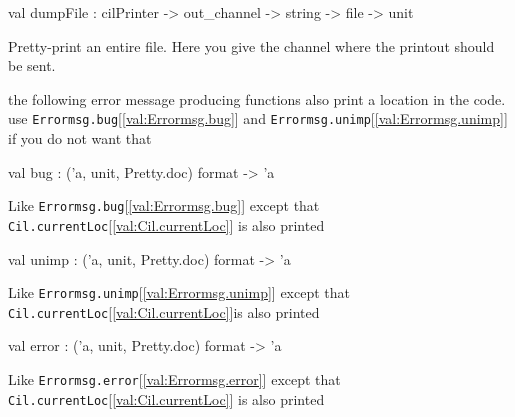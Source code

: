\documentclass[11pt]{article}
\begin{document}
\label{val:Cil.dumpFile}\begin{ocamldoccode}
val dumpFile : cilPrinter -> out_channel -> string -> file -> unit
\end{ocamldoccode}
\begin{ocamldocdescription}
Pretty-print an entire file. Here you give the channel where the printout
 should be sent.


\end{ocamldocdescription}




the following error message producing functions also print a location in 
 the code. use {\tt{Errormsg.bug}}[\ref{val:Errormsg.bug}] and {\tt{Errormsg.unimp}}[\ref{val:Errormsg.unimp}] if you do not want 
 that



\label{val:Cil.bug}\begin{ocamldoccode}
val bug : ('a, unit, Pretty.doc) format -> 'a
\end{ocamldoccode}
\begin{ocamldocdescription}
Like {\tt{Errormsg.bug}}[\ref{val:Errormsg.bug}] except that {\tt{Cil.currentLoc}}[\ref{val:Cil.currentLoc}] is also printed


\end{ocamldocdescription}




\label{val:Cil.unimp}\begin{ocamldoccode}
val unimp : ('a, unit, Pretty.doc) format -> 'a
\end{ocamldoccode}
\begin{ocamldocdescription}
Like {\tt{Errormsg.unimp}}[\ref{val:Errormsg.unimp}] except that {\tt{Cil.currentLoc}}[\ref{val:Cil.currentLoc}]is also printed


\end{ocamldocdescription}




\label{val:Cil.error}\begin{ocamldoccode}
val error : ('a, unit, Pretty.doc) format -> 'a
\end{ocamldoccode}
\begin{ocamldocdescription}
Like {\tt{Errormsg.error}}[\ref{val:Errormsg.error}] except that {\tt{Cil.currentLoc}}[\ref{val:Cil.currentLoc}] is also printed


\end{ocamldocdescription}
\end{document}
